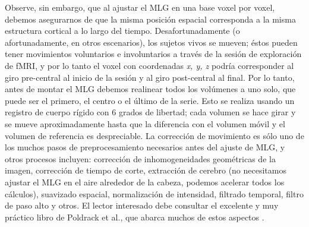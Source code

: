 \documentclass[12pt,a5,twoside]{book}
\begin{document}
Observe, sin embargo, que al ajustar el MLG en una base voxel por voxel, debemos asegurarnos de que la misma posición espacial corresponda a la misma estructura cortical a lo largo del tiempo. Desafortunadamente (o afortunadamente, en otros escenarios), los sujetos vivos se mueven; éstos pueden tener movimientos voluntarios e involuntarios a través de la sesión de exploración de fMRI, y por lo tanto el voxel con coordenadas {\it x, y, z} podría corresponder al giro pre-central al inicio de la sesión y al giro post-central al final. Por lo tanto, antes de montar el MLG debemos realinear todos los volúmenes a uno solo, que puede ser el primero, el centro o el último de la serie. Esto se realiza usando un registro de cuerpo rígido con 6 grados de libertad; cada volumen se hace girar y se mueve aproximadamente hasta que la diferencia con el volumen móvil y el volumen de referencia es despreciable. La corrección de movimiento es sólo uno de los muchos pasos de preprocesamiento necesarios antes del ajuste de MLG, y otros procesos incluyen: corrección de inhomogeneidades geométricas de la imagen, corrección de tiempo de corte, extracción de cerebro (no necesitamos ajustar el MLG en el aire alrededor de la cabeza, podemos acelerar todos los cálculos), suavizado espacial, normalización de intensidad, filtrado temporal, filtro de paso alto y otros. El lector interesado debe consultar el excelente y muy práctico libro de Poldrack et al., que abarca muchos de estos aspectos \citep{Poldrack_2011}.
\end{document}

